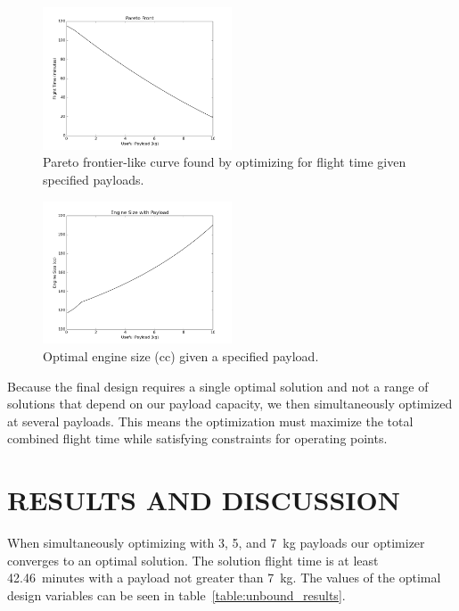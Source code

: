 \documentclass[letterpaper, 10 pt, conference]{ieeeconf}  %
\begin{document}
\begin{figure}
	\includegraphics[width=0.5\textwidth]{pareto_front.png}
	\caption{Pareto frontier-like curve found by optimizing for flight time given specified payloads.}
		\label{fig:payload}
\end{figure}

\begin{figure}
	\includegraphics[width=0.5\textwidth]{engine_size_vs_payload.png}
	\caption{Optimal engine size (cc) given a specified payload.}
		\label{fig:eng_v_pl}
\end{figure}

Because the final design requires a single optimal solution and not a range of solutions that depend on our payload capacity, we then simultaneously optimized at several payloads. This means the optimization must maximize the total combined flight time while satisfying constraints for operating points.

\section{RESULTS AND DISCUSSION}

When simultaneously optimizing with 3, 5, and 7~kg payloads our optimizer converges to an optimal solution. The solution flight time is at least 42.46~minutes with a payload not greater than 7~kg. The values of the optimal design variables can be seen in table~\ref{table:unbound_results}. 
\end{document}
